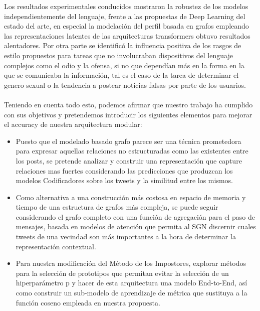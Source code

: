 Los resultados experimentales conducidos mostraron la robustez de los modelos independientemente del lenguaje, frente a las propuestas de Deep Learning del estado del arte, en especial la modelación del perfil basada en grafos empleando las representaciones latentes de las arquitecturas transformers obtuvo resultados alentadores. Por otra parte se identificó la influencia positiva de los rasgos de estilo propuestos para tareas que no involucraban dispositivos del lenguaje complejos como el odio y la ofensa, si no que dependían más en la forma en la que se comunicaba la información, tal es el caso de la tarea de determinar el genero sexual o la tendencia a postear noticias falsas por parte de los usuarios.
\\\\
Teniendo en cuenta todo esto, podemos afirmar que nuestro trabajo ha cumplido con sus objetivos y pretendemos introducir los siguientes elementos para mejorar el accuracy de nuestra arquitectura modular:
\begin{itemize}
	\item Puesto que el modelado basado grafo parece ser una técnica prometedora para expresar aquellas relaciones no estructuradas como las existentes entre los posts, se pretende analizar y construir una representación que capture relaciones mas fuertes considerando las predicciones que produzcan los modelos Codificadores sobre los tweets y la similitud entre los mismos.
	\item Como alternativa a una construcción más costosa en espacio de memoria y tiempo de una estructura de grafos más compleja, se puede seguir considerando el grafo completo con una función de agregación para el paso de mensajes, basada en modelos de atención que permita al SGN discernir cuales tweets de una vecindad son más importantes a la hora de determinar la representación contextual.
	\item Para nuestra modificación del Método de los Impostores, explorar métodos para la selección de prototipos que permitan evitar la selección de un hiperparámetro p y hacer de esta arquitectura una modelo End-to-End, así como construir un sub-modelo de aprendizaje de métrica que sustituya a la función coseno empleada en nuestra propuesta.
\end{itemize}
